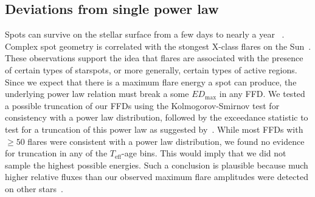 \documentclass{aa}
\begin{document}
\subsection{Deviations from single power law}
Spots can survive on the stellar surface from a few days to nearly a year~
\citep{namekata_solarstellarwlf_2017, davenport_flaresandspots_2015}. Complex spot geometry is correlated with the stongest X-class flares on the Sun~\citep{toriumi_flaresspotssun_2017, sammis_deltaspotsflares_2000}. These observations support the idea that flares are associated with the presence of certain types of starspots, or more generally, certain types of active regions. Since we expect that there is a maximum flare energy a spot can produce, the underlying power law relation must break a some $ED_\mathrm{max}$ in any FFD. We tested a possible truncation of our FFDs using the Kolmogorov-Smirnov test for consistency with a power law distribution, followed by the exceedance statistic to test for a truncation of this power law as suggested by~\citet{maschberger2009}. While most FFDs with $\geqslant50$ flares were consistent with a power law distribution, we found no evidence for truncation in any of the $T_\mathrm{eff}$-age bins. This would imply that we did not sample the highest possible energies. Such a conclusion is plausible because much higher relative fluxes than our observed maximum flare amplitudes were detected on other stars~\citep{paudel_monsterucdflare_2018, jackman_superflareucd_2019, schmidt2016}.
\end{document}
